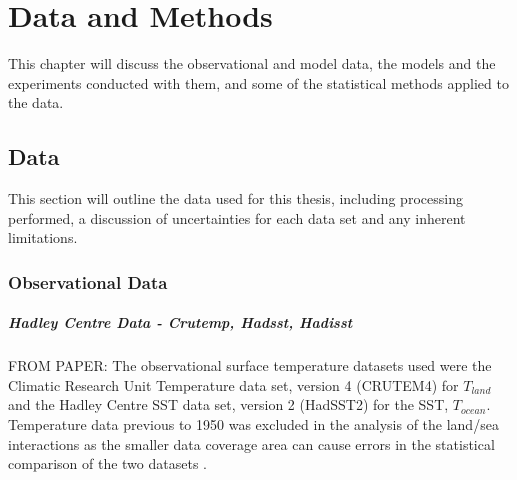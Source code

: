 \chapter{Data and Methods} %

\label{methods} %


This chapter will discuss the observational and model data, the models and the 
experiments conducted with them, and some of the statistical methods applied to 
the data.


\section{Data}

This section will outline the data used for this thesis, including processing 
performed, a discussion of uncertainties for each data set and any inherent 
limitations.

\subsection{Observational Data}

\paragraph{Hadley Centre Data - Crutemp, Hadsst, Hadisst}
FROM PAPER: The observational surface temperature datasets used were the 
Climatic Research Unit Temperature data set, version 4 (CRUTEM4) 
\citep{Brohan2006} for $T_{land}$ and the Hadley Centre SST data set, version 2 
(HadSST2) \citep{Rayner2006}for the SST, $T_{ocean}$.  Temperature data previous 
to 1950 was excluded in the analysis of the land/sea interactions as the smaller 
data coverage area can cause errors in the statistical comparison of the two 
datasets \citep{Dommenget2009}.

